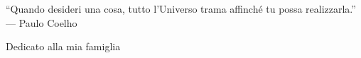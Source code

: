 
\cleardoublepage
{}
\thispagestyle{empty}

\vspace*{3cm}

\begin{center}
    “Quando desideri una cosa, tutto l’Universo trama affinché tu possa realizzarla.” \\ \medskip
--- Paulo Coelho    
\end{center}

\medskip

\begin{center}
Dedicato alla mia famiglia
\end{center}
